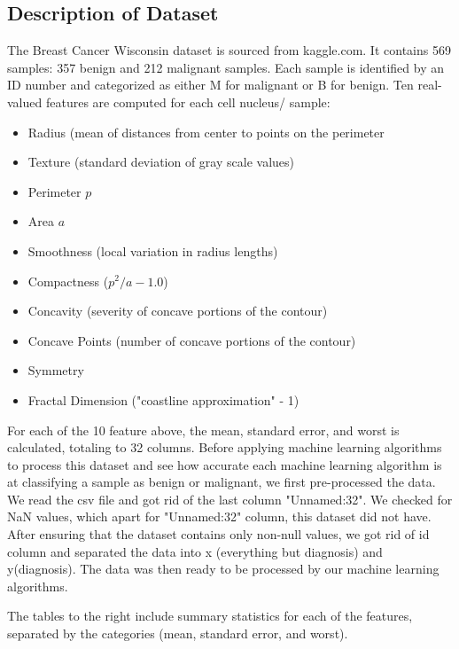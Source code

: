 \documentclass[conference]{IEEEtran}
\begin{document}
\subsection{Description of Dataset}
The Breast Cancer Wisconsin dataset is sourced from kaggle.com. It contains 569 samples: 357 benign and 212 malignant samples. Each sample is identified by an ID number and categorized as either M for malignant or B for benign. Ten real-valued features are computed for each cell nucleus/ sample: 
\begin{itemize}
	\item Radius (mean of distances from center to points on the perimeter
 	\item Texture (standard deviation of gray scale values)
  	\item Perimeter $p$
   	\item Area $a$
        \item Smoothness (local variation in radius lengths)
        \item Compactness ($p^2 / a - 1.0$)
        \item Concavity (severity of concave portions of the contour)
        \item Concave Points (number of concave portions of the contour)
	\item Symmetry
 	\item Fractal Dimension ("coastline approximation" - 1)
\end{itemize}
For each of the 10 feature above, the mean, standard error, and worst is calculated, totaling to 32 columns. Before applying machine learning algorithms to process this dataset and see how accurate each machine learning algorithm is at classifying a sample as benign or malignant, we first pre-processed the data. We read the csv file and got rid of the last column "Unnamed:32". We checked for NaN values, which apart for "Unnamed:32" column, this dataset did not have. After ensuring that the dataset contains only non-null values, we got rid of id column and separated the data into x (everything but diagnosis) and y(diagnosis). The data was then ready to be processed by our machine learning algorithms.

The tables to the right include summary statistics for each of the features, separated by the categories (mean, standard error, and worst).
\end{document}
